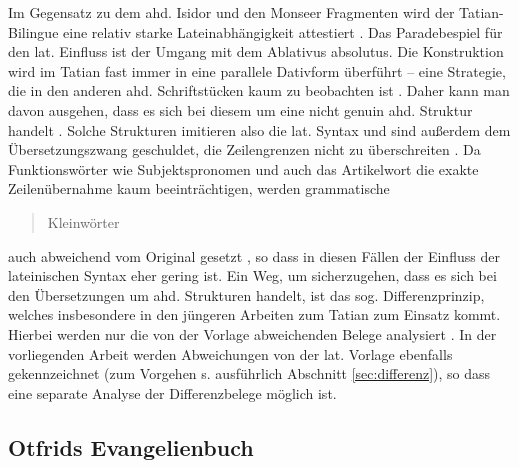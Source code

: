 

Im Gegensatz zu dem ahd. Isidor und den Monseer Fragmenten wird der Tatian-Bilingue eine relativ starke Lateinabhängigkeit attestiert \parencites(){Lippert1974}[128]{Sonderegger2003}. Das Paradebespiel für den lat. Einfluss ist der Umgang mit dem Ablativus absolutus. Die Konstruktion wird im Tatian fast immer in eine parallele Dativform überführt -- eine Strategie, die in den anderen ahd. Schriftstücken kaum zu beobachten ist \parencite[145f]{Lippert1974}. Daher kann man davon ausgehen, dass es sich bei diesem  um eine nicht genuin ahd. Struktur handelt \parencite[zur vertiefenden Diskussion s.][39--40]{Fleischer2011}. Solche Strukturen imitieren also die lat. Syntax und sind außerdem dem Übersetzungszwang geschuldet, die Zeilengrenzen nicht zu überschreiten \parencite[136]{Masser1997}. Da Funktionswörter wie Subjektspronomen und auch das Artikelwort  die exakte Zeilenübernahme kaum beeinträchtigen, werden grammatische \blockcquote[43]{Fleischer2011}{Kleinwörter} auch abweichend vom Original gesetzt \parencites[vgl. auch][20]{Dittmer1998}, so dass in diesen Fällen der Einfluss der lateinischen Syntax eher gering ist.  
Ein Weg, um sicherzugehen, dass es sich bei den Übersetzungen um  ahd. Strukturen handelt, ist das sog. Differenzprinzip, welches insbesondere in den jüngeren Arbeiten zum Tatian zum Einsatz kommt. Hierbei werden nur die von der Vorlage abweichenden Belege analysiert \parencite{Dittmer1998,Hinterholzl2005,Fleischer2008}. In der vorliegenden Arbeit werden Abweichungen von der lat. Vorlage ebenfalls gekennzeichnet (zum Vorgehen s. ausführlich Abschnitt \ref{sec:differenz}), so dass eine separate Analyse der Differenzbelege möglich ist.  


\subsection{Otfrids Evangelienbuch}


